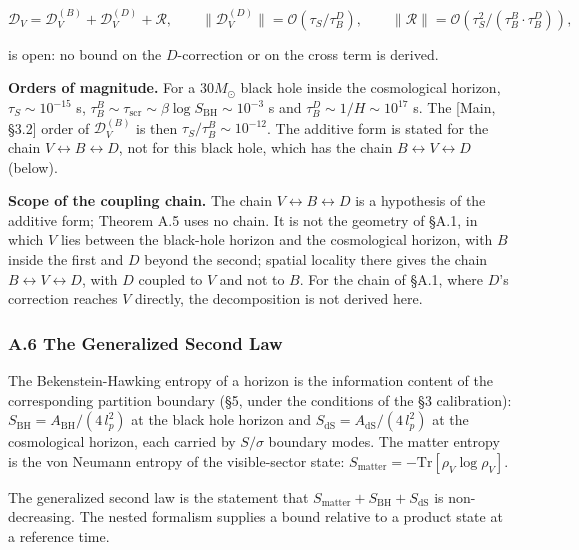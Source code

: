 \documentclass[
]{article}
\begin{document}
\[\mathcal{D}_V = \mathcal{D}_V^{(B)} + \mathcal{D}_V^{(D)} + \mathcal{R}, \qquad \|\mathcal{D}_V^{(D)}\| = \mathcal{O}(\tau_S / \tau_B^D), \qquad \|\mathcal{R}\| = \mathcal{O}(\tau_S^2 / (\tau_B^B \cdot \tau_B^D)),\]

is open: no bound on the \(D\)-correction or on the cross term is
derived.

\textbf{Orders of magnitude.} For a \(30 M_\odot\) black hole inside the
cosmological horizon, \(\tau_S \sim 10^{-15}\) s,
\(\tau_B^B \sim \tau_{\text{scr}} \sim \beta \log S_{\text{BH}} \sim 10^{-3}\)
s and \(\tau_B^D \sim 1/H \sim 10^{17}\) s. The {[}Main, §3.2{]} order
of \(\mathcal{D}_V^{(B)}\) is then \(\tau_S/\tau_B^B \sim 10^{-12}\).
The additive form is stated for the chain
\(V \leftrightarrow B \leftrightarrow D\), not for this black hole,
which has the chain \(B \leftrightarrow V \leftrightarrow D\) (below).

\textbf{Scope of the coupling chain.} The chain
\(V \leftrightarrow B \leftrightarrow D\) is a hypothesis of the
additive form; Theorem A.5 uses no chain. It is not the geometry of
§A.1, in which \(V\) lies between the black-hole horizon and the
cosmological horizon, with \(B\) inside the first and \(D\) beyond the
second; spatial locality there gives the chain
\(B \leftrightarrow V \leftrightarrow D\), with \(D\) coupled to \(V\)
and not to \(B\). For the chain of §A.1, where \(D\)'s correction
reaches \(V\) directly, the decomposition is not derived here.

\hypertarget{a.6-the-generalized-second-law}{%
\subsubsection{A.6 The Generalized Second
Law}\label{a.6-the-generalized-second-law}}

The Bekenstein-Hawking entropy of a horizon is the information content
of the corresponding partition boundary (§5, under the conditions of the
§3 calibration): \(S_{\text{BH}} = A_{\text{BH}} / (4\,l_p^2)\) at the
black hole horizon and \(S_{\text{dS}} = A_{\text{dS}} / (4\,l_p^2)\) at
the cosmological horizon, each carried by \(S/\sigma\) boundary modes.
The matter entropy is the von Neumann entropy of the visible-sector
state: \(S_{\text{matter}} = -\text{Tr}[\rho_V \log \rho_V]\).

The generalized second law is the statement that
\(S_{\text{matter}} + S_{\text{BH}} + S_{\text{dS}}\) is non-decreasing.
The nested formalism supplies a bound relative to a product state at a
reference time.
\end{document}
